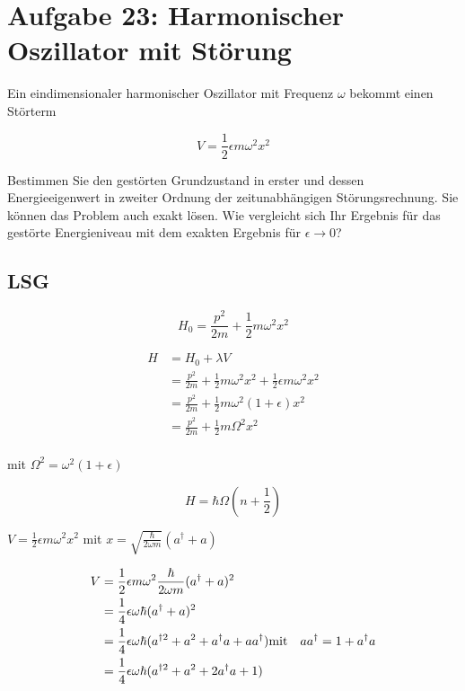 



\section*{Aufgabe 23: Harmonischer Oszillator mit Störung}

Ein eindimensionaler harmonischer Oszillator mit Frequenz \(\omega\) bekommt einen Störterm

\[V=\frac{1}{2}\epsilon m \omega^2x^2\]

Bestimmen Sie den gestörten Grundzustand in erster und dessen Energieeigenwert in zweiter Ordnung der zeitunabhängigen Störungsrechnung. Sie können das Problem auch exakt lösen. Wie vergleicht sich Ihr Ergebnis für das gestörte Energieniveau mit dem exakten Ergebnis für \(\epsilon \rightarrow 0\)?

\subsection*{LSG}

\[ H_0 = \frac{p^2}{2m} + \frac{1}{2}m\omega^2 x^2 \]

\begin{align}
H &= H_0 + \lambda V \\
& = \frac{p^2}{2m} + \frac{1}{2}m\omega^2 x^2 +  \frac{1}{2}\epsilon m \omega^2x^2  \\
& = \frac{p^2}{2m} + \frac{1}{2}m\omega^2(1  + \epsilon ) x^2  \\
& = \frac{p^2}{2m} + \frac{1}{2}m\Omega^2 x^2  \\
\end{align}


mit \(\Omega^2 = \omega^2(1  + \epsilon)\)

\[ H = \hbar \Omega(n+\frac{1}{2})\]

\(V=\frac{1}{2}\epsilon m \omega^2x^2\) mit \(x=\sqrt{\frac{\hbar}{2\omega m}}(a^\dagger+a)\) 

\begin{align}
V&=\frac{1}{2}\epsilon m \omega^2\frac{\hbar}{2\omega m}(a^\dagger+a)^2 \\
&=\frac{1}{4}\epsilon \omega\hbar(a^\dagger+a)^2 \\
&=\frac{1}{4}\epsilon \omega\hbar(a^{\dagger 2} + a^2+a^\dagger a+ aa^\dagger) \text{mit\quad} aa^\dagger=1+a^\dagger a\\
&=\frac{1}{4}\epsilon \omega\hbar(a^{\dagger 2} + a^2+2a^\dagger a+ 1)
\end{align}


